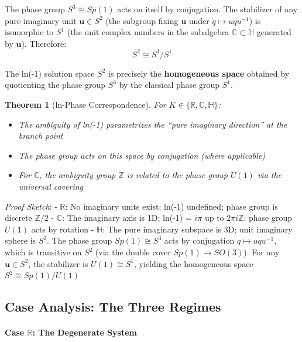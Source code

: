 \documentclass[11pt]{article}
\newtheorem{theorem}{Theorem}[section]
\begin{document}
The phase group \(S^3 \cong Sp(1)\) acts on itself by conjugation. The stabilizer of any pure imaginary unit \(\mathbf{u} \in S^2\) (the subgroup fixing \(\mathbf{u}\) under \(q \mapsto uqu^{-1}\)) is isomorphic to \(S^1\) (the unit complex numbers in the subalgebra \(\mathbb{C} \subset \mathbb{H}\) generated by \(\mathbf{u}\)). Therefore: \[S^2 \cong S^3 / S^1\]

The ln(-1) solution space \(S^2\) is precisely the \textbf{homogeneous space} obtained by quotienting the phase group \(S^3\) by the classical phase group \(S^1\).


\begin{theorem}[ln-Phase Correspondence]\label{thm:ln-phase}
For \(K \in \{\mathbb{R}, \mathbb{C}, \mathbb{H}\}\):
\begin{itemize}
\item The ambiguity of ln(-1) parametrizes the ``pure imaginary direction'' at the branch point
\item The phase group acts on this space by conjugation (where applicable)
\item For $\mathbb{C}$, the ambiguity group $\mathbb{Z}$ is related to the phase group $U(1)$ via the universal covering
\end{itemize}
\end{theorem}

\emph{Proof Sketch}: - $\mathbb{R}$: No imaginary units exist; ln(-1) undefined; phase group is discrete \(\mathbb{Z}/2\) - $\mathbb{C}$: The imaginary axis is 1D; ln(-1) = \(i\pi\) up to \(2\pi i \mathbb{Z}\); phase group \(U(1)\) acts by rotation - $\mathbb{H}$: The pure imaginary subspace is 3D; unit imaginary sphere is \(S^2\). The phase group \(Sp(1) \cong S^3\) acts by conjugation \(q \mapsto uqu^{-1}\), which is transitive on \(S^2\) (via the double cover \(Sp(1) \to SO(3)\)). For any \(\mathbf{u} \in S^2\), the stabilizer is \(U(1) \cong S^1\), yielding the homogeneous space \(S^2 \cong Sp(1)/U(1)\)

\subsection{Case Analysis: The Three Regimes}
\label{sec:case-analysis}

\paragraph{Case $\mathbb{R}$: The Degenerate System}
\label{case-ux211d-the-degenerate-system}
\end{document}
